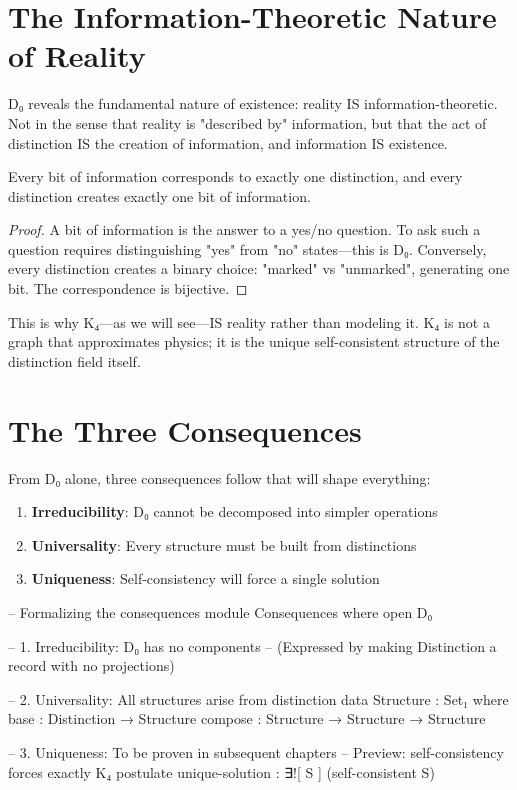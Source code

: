 \section{The Information-Theoretic Nature of Reality}

D₀ reveals the fundamental nature of existence: reality IS information-theoretic. Not in the sense that reality is "described by" information, but that the act of distinction IS the creation of information, and information IS existence.

\begin{theorem}
\label{thm:info-distinction}
Every bit of information corresponds to exactly one distinction, and every distinction creates exactly one bit of information.
\end{theorem}

\begin{proof}
A bit of information is the answer to a yes/no question. To ask such a question requires distinguishing "yes" from "no" states—this is D₀. Conversely, every distinction creates a binary choice: "marked" vs "unmarked", generating one bit. The correspondence is bijective.
\end{proof}

This is why K₄—as we will see—IS reality rather than modeling it. K₄ is not a graph that approximates physics; it is the unique self-consistent structure of the distinction field itself.

\section{The Three Consequences}

From D₀ alone, three consequences follow that will shape everything:

\begin{enumerate}
\item \textbf{Irreducibility}: D₀ cannot be decomposed into simpler operations
\item \textbf{Universality}: Every structure must be built from distinctions
\item \textbf{Uniqueness}: Self-consistency will force a single solution
\end{enumerate}

\begin{code}
-- Formalizing the consequences
module Consequences where
  open D₀
  
  -- 1. Irreducibility: D₀ has no components
  -- (Expressed by making Distinction a record with no projections)
  
  -- 2. Universality: All structures arise from distinction
  data Structure : Set₁ where
    base : Distinction → Structure
    compose : Structure → Structure → Structure
  
  -- 3. Uniqueness: To be proven in subsequent chapters
  -- Preview: self-consistency forces exactly K₄
  postulate
    unique-solution : ∃![ S ] (self-consistent S)
\end{code}

